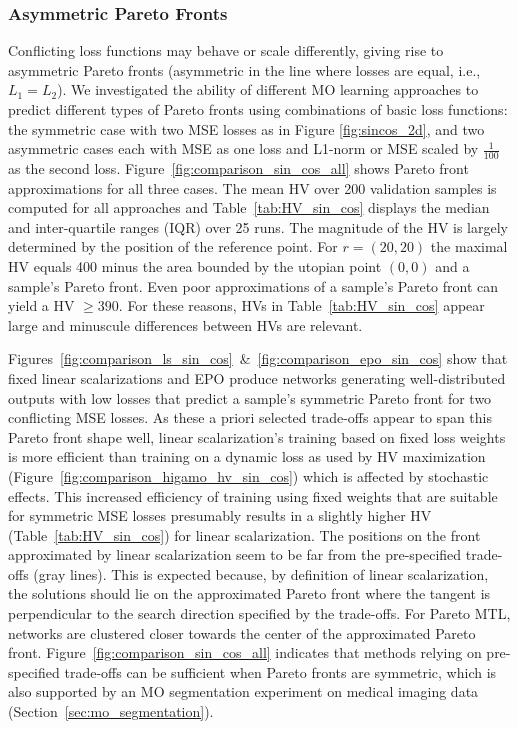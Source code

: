 \subsubsection{Asymmetric Pareto Fronts}
\label{sec:sin_cos_asymmetric}
Conflicting loss functions may behave or scale differently, giving rise to asymmetric Pareto fronts (asymmetric in the line where losses are equal, i.e., $L_{1}=L_{2}$). We investigated the ability of different MO learning approaches to predict different types of Pareto fronts using combinations of basic loss functions: the symmetric case with two MSE losses as in Figure \ref{fig:sincos_2d}, and two asymmetric cases each with MSE as one loss and L1-norm or MSE scaled by $\tfrac{1}{100}$ as the second loss. Figure~\ref{fig:comparison_sin_cos_all} shows Pareto front approximations for all three cases. The mean HV over 200 validation samples is computed for all approaches and Table~\ref{tab:HV_sin_cos} displays the median and inter-quartile ranges (IQR) over 25 runs. %
The magnitude of the HV is largely determined by the position of the reference point. For $r=(20,20)$ the maximal HV equals 400 minus the area bounded by the utopian point $(0,0)$ and a sample's Pareto front. Even poor approximations of a sample's Pareto front can yield a HV $\geq390$. For these reasons, HVs in Table~\ref{tab:HV_sin_cos} appear large and minuscule differences between HVs are relevant.

Figures~\ref{fig:comparison_ls_sin_cos}~\&~\ref{fig:comparison_epo_sin_cos} show that fixed linear scalarizations and EPO produce networks generating well-distributed outputs with low losses that predict a sample's symmetric Pareto front for two conflicting MSE losses. As these a priori selected trade-offs appear to span this Pareto front shape well, linear scalarization's training based on fixed loss weights is more efficient than training on a dynamic loss as used by HV maximization (Figure~\ref{fig:comparison_higamo_hv_sin_cos}) which is affected by stochastic effects. This increased efficiency of training using fixed weights that are suitable for symmetric MSE losses presumably results in a slightly higher HV (Table~\ref{tab:HV_sin_cos}) for linear scalarization. 
The positions on the front approximated by linear scalarization seem to be far from the pre-specified trade-offs (gray lines). This is expected because, by definition of linear scalarization, the solutions should lie on the approximated Pareto front where the tangent is perpendicular to the search direction specified by the trade-offs. For Pareto MTL, networks are clustered closer towards the center of the approximated Pareto front. Figure~\ref{fig:comparison_sin_cos_all} indicates that methods relying on pre-specified trade-offs can be sufficient when Pareto fronts are symmetric, which is also supported by an MO segmentation experiment on medical imaging data (Section~\ref{sec:mo_segmentation}).

